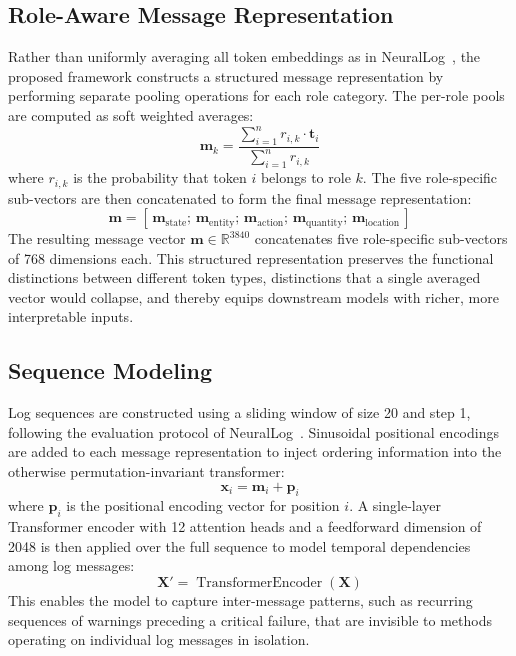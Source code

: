 \subsection{Role-Aware Message Representation}

Rather than uniformly averaging all token embeddings as in NeuralLog~\cite{neurallog2021}, the proposed framework constructs a structured message representation by performing separate pooling operations for each role category. The per-role pools are computed as soft weighted averages:
\begin{equation}
\mathbf{m}_k = \frac{\displaystyle\sum_{i=1}^{n} r_{i,k} \cdot \mathbf{t}_i}{\displaystyle\sum_{i=1}^{n} r_{i,k}}
\end{equation}
where $r_{i,k}$ is the probability that token $i$ belongs to role $k$. The five role-specific sub-vectors are then concatenated to form the final message representation:
\begin{equation}
\mathbf{m} = [\,\mathbf{m}_{\text{state}};\, \mathbf{m}_{\text{entity}};\, \mathbf{m}_{\text{action}};\, \mathbf{m}_{\text{quantity}};\, \mathbf{m}_{\text{location}}\,]
\end{equation}
The resulting message vector $\mathbf{m} \in \mathbb{R}^{3840}$ concatenates five role-specific sub-vectors of 768 dimensions each. This structured representation preserves the functional distinctions between different token types, distinctions that a single averaged vector would collapse, and thereby equips downstream models with richer, more interpretable inputs.

\subsection{Sequence Modeling}

Log sequences are constructed using a sliding window of size 20 and step 1, following the evaluation protocol of NeuralLog~\cite{neurallog2021}. Sinusoidal positional encodings~\cite{vaswani2017attention} are added to each message representation to inject ordering information into the otherwise permutation-invariant transformer:
\begin{equation}
\mathbf{x}_i = \mathbf{m}_i + \mathbf{p}_i
\end{equation}
where $\mathbf{p}_i$ is the positional encoding vector for position $i$. A single-layer Transformer encoder with 12 attention heads and a feedforward dimension of 2048 is then applied over the full sequence to model temporal dependencies among log messages:
\begin{equation}
\mathbf{X}' = \operatorname{TransformerEncoder}(\mathbf{X})
\end{equation}
This enables the model to capture inter-message patterns, such as recurring sequences of warnings preceding a critical failure, that are invisible to methods operating on individual log messages in isolation.

